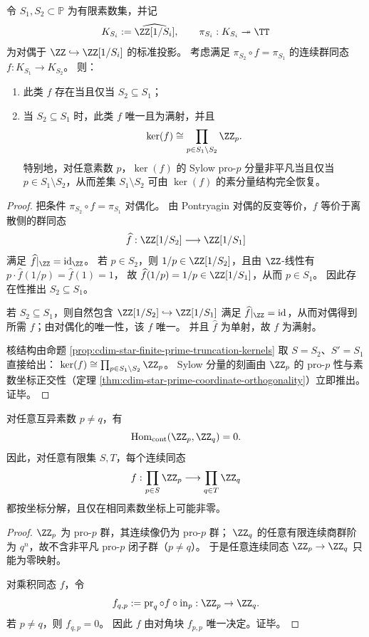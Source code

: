 \begin{theorem}\label{thm:cdim-solenoid-over-t-morphism-classification}
令 \(S_1,S_2\subset\mathbb{P}\) 为有限素数集，并记
\[
K_{S_i}:=\widehat{\ZZ[1/S_i]},\qquad \pi_{S_i}:K_{S_i}\twoheadrightarrow\TT
\]
为对偶于 \(\ZZ\hookrightarrow \ZZ[1/S_i]\) 的标准投影。
考虑满足 \(\pi_{S_2}\circ f=\pi_{S_1}\) 的连续群同态 \(f:K_{S_1}\to K_{S_2}\)。
则：
\begin{enumerate}
  \item 此类 \(f\) 存在当且仅当 \(S_2\subseteq S_1\)；
  \item 当 \(S_2\subseteq S_1\) 时，此类 \(f\) 唯一且为满射，并且
  \[
  \ker(f)\cong \prod_{p\in S_1\setminus S_2}\ZZ_p.
  \]
  特别地，对任意素数 \(p\)，\(\ker(f)\) 的 Sylow pro-\(p\) 分量非平凡当且仅当 \(p\in S_1\setminus S_2\)，从而差集 \(S_1\setminus S_2\) 可由 \(\ker(f)\) 的素分量结构完全恢复。
\end{enumerate}
\end{theorem}
\begin{proof}
把条件 \(\pi_{S_2}\circ f=\pi_{S_1}\) 对偶化。
由 Pontryagin 对偶的反变等价，\(f\) 等价于离散侧的群同态
\[
\widehat f:\ZZ[1/S_2]\longrightarrow \ZZ[1/S_1]
\]
满足 \(\widehat f|_{\ZZ}=\mathrm{id}_{\ZZ}\)。
若 \(p\in S_2\)，则 \(1/p\in \ZZ[1/S_2]\)，且由 \(\ZZ\)-线性有
\(
p\cdot \widehat f(1/p)=\widehat f(1)=1
\)，
故 \(\widehat f(1/p)=1/p\in \ZZ[1/S_1]\)，从而 \(p\in S_1\)。
因此存在性推出 \(S_2\subseteq S_1\)。
\par
若 \(S_2\subseteq S_1\)，则自然包含 \(\ZZ[1/S_2]\hookrightarrow \ZZ[1/S_1]\) 满足 \(\widehat f|_{\ZZ}=\mathrm{id}\)，从而对偶得到所需 \(f\)；由对偶化的唯一性，该 \(f\) 唯一。
并且 \(\widehat f\) 为单射，故 \(f\) 为满射。
\par
核结构由命题 \ref{prop:cdim-star-finite-prime-truncation-kernels} 取 \(S=S_2\)、\(S'=S_1\) 直接给出：
\(
\ker(f)\cong\prod_{p\in S_1\setminus S_2}\ZZ_p
\)。
Sylow 分量的刻画由 \(\ZZ_p\) 的 pro-\(p\) 性与素数坐标正交性（定理 \ref{thm:cdim-star-prime-coordinate-orthogonality}）立即推出。证毕。
\end{proof}

\begin{theorem}[素数坐标的连续正交性]\label{thm:cdim-star-prime-coordinate-orthogonality}
对任意互异素数 \(p\neq q\)，有
\[
\operatorname{Hom}_{\mathrm{cont}}(\ZZ_p,\ZZ_q)=0.
\]
因此，对任意有限集 \(S,T\)，每个连续同态
\[
f:\prod_{p\in S}\ZZ_p\longrightarrow \prod_{q\in T}\ZZ_q
\]
都按坐标分解，且仅在相同素数坐标上可能非零。
\end{theorem}
\begin{proof}
\(\ZZ_p\) 为 pro-\(p\) 群，其连续像仍为 pro-\(p\) 群；
\(\ZZ_q\) 的任意有限连续商群阶为 \(q^n\)，故不含非平凡 pro-\(p\) 闭子群（\(p\neq q\)）。
于是任意连续同态 \(\ZZ_p\to\ZZ_q\) 只能为零映射。

对乘积同态 \(f\)，令
\[
f_{q,p}:=\operatorname{pr}_q\circ f\circ \operatorname{in}_p:\ZZ_p\to\ZZ_q.
\]
若 \(p\neq q\)，则 \(f_{q,p}=0\)。
因此 \(f\) 由对角块 \(f_{p,p}\) 唯一决定。证毕。
\end{proof}

